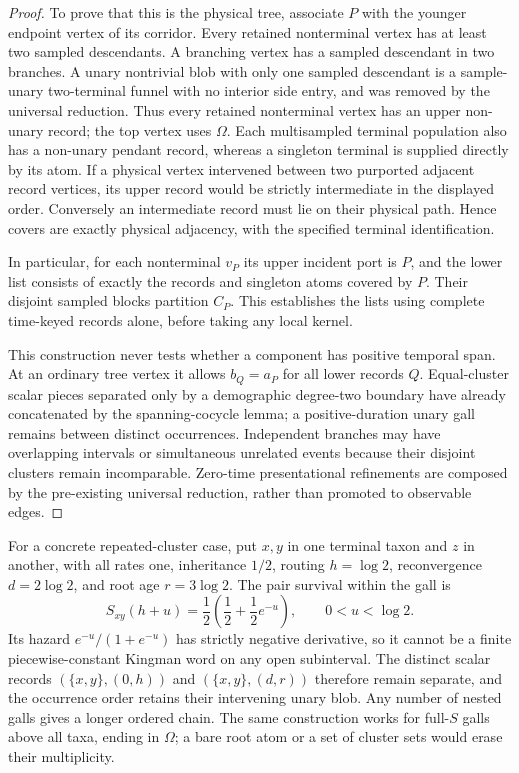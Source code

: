 \documentclass[11pt]{article}
\begin{document}
\begin{proof}
To prove that this is the physical tree, associate $P$ with the younger endpoint vertex of its corridor.  Every retained nonterminal vertex has at least two sampled descendants.  A branching vertex has a sampled descendant in two branches.  A unary nontrivial blob with only one sampled descendant is a sample-unary two-terminal funnel with no interior side entry, and was removed by the universal reduction.  Thus every retained nonterminal vertex has an upper non-unary record; the top vertex uses $\Omega$.  Each multisampled terminal population also has a non-unary pendant record, whereas a singleton terminal is supplied directly by its atom.  If a physical vertex intervened between two purported adjacent record vertices, its upper record would be strictly intermediate in the displayed order.  Conversely an intermediate record must lie on their physical path.  Hence covers are exactly physical adjacency, with the specified terminal identification.

In particular, for each nonterminal $v_P$ its upper incident port is $P$, and the lower list consists of exactly the records and singleton atoms covered by $P$.  Their disjoint sampled blocks partition $C_P$.  This establishes the lists using complete time-keyed records alone, before taking any local kernel.

This construction never tests whether a component has positive temporal span.  At an ordinary tree vertex it allows $b_Q=a_P$ for all lower records $Q$.  Equal-cluster scalar pieces separated only by a demographic degree-two boundary have already concatenated by the spanning-cocycle lemma; a positive-duration unary gall remains between distinct occurrences.  Independent branches may have overlapping intervals or simultaneous unrelated events because their disjoint clusters remain incomparable.  Zero-time presentational refinements are composed by the pre-existing universal reduction, rather than promoted to observable edges.
\end{proof}

For a concrete repeated-cluster case, put $x,y$ in one terminal taxon and $z$ in another, with all rates one, inheritance $1/2$, routing $h=\log2$, reconvergence $d=2\log2$, and root age $r=3\log2$.  The pair survival within the gall is
\[
S_{xy}(h+u)=\frac12\left(\frac12+\frac12e^{-u}\right),
\qquad 0<u<\log2.
\]
Its hazard $e^{-u}/(1+e^{-u})$ has strictly negative derivative, so it cannot be a finite piecewise-constant Kingman word on any open subinterval.  The distinct scalar records $(\{x,y\},(0,h))$ and $(\{x,y\},(d,r))$ therefore remain separate, and the occurrence order retains their intervening unary blob.  Any number of nested galls gives a longer ordered chain.  The same construction works for full-$S$ galls above all taxa, ending in $\Omega$; a bare root atom or a set of cluster sets would erase their multiplicity.
\end{document}
